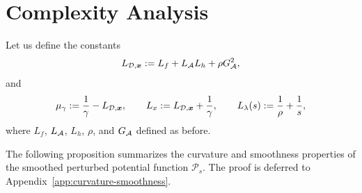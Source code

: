 \fi

\section{Complexity Analysis}
\label{sec:complexity-analysis}
\label{sec:basic-descent}
Let us define the constants
\begin{equation}
    L_{\mathcal{D},\bm{x}}
    :=
    L_f + L_{\mathcal{A}}L_h + \rho G_{\mathcal{A}}^{2},
    \label{eq:x-weak-convexity-modulus}
\end{equation}
and 
\[
    \mu_\gamma
    :=
    \frac{1}{\gamma}-L_{\mathcal{D},\bm{x}},
    \qquad
    L_x
    :=
    L_{\mathcal{D},\bm{x}}+\frac{1}{\gamma},
    \qquad
    L_\lambda(s)
    :=
    \frac{1}{\rho}+\frac{1}{s},
\] where $L_f$, $L_{\mathcal{A}}$, $L_h$, $\rho$, and $G_{\mathcal{A}}$ defined as before. 

The following proposition summarizes the curvature and smoothness properties
of the smoothed perturbed potential function $\mathcal P_s$.
The proof is deferred to Appendix~\ref{app:curvature-smoothness}.


